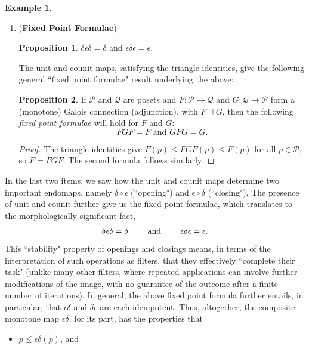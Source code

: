 \documentclass[a4paper]{book}
\theoremstyle{definition}
\newtheorem{example}{Example}[section]
\theoremstyle{definition}
\theoremstyle{definition}
\newtheorem{proposition}{Proposition}[section]
\theoremstyle{theorem}
\theoremstyle{definition}
\begin{document}
\begin{example}
\begin{enumerate}
\item (\textbf{Fixed Point Formulae}) 
\begin{proposition} 
	$\delta \epsilon \delta = \delta$ and $\epsilon \delta \epsilon = \epsilon$.
\end{proposition} 
The unit and counit maps, satisfying the triangle identities, give the following general ``fixed point formulae" result underlying the above: 
\begin{proposition}
	If $\mathcal{P}$ and $\mathcal{Q}$ are posets and $F: \mathcal{P} \rightarrow \mathcal{Q}$ and $G: \mathcal{Q} \rightarrow \mathcal{P}$ form a (monotone) Galois connection (adjunction), with $F \dashv G$, then the following \textit{fixed point formulae} will hold for $F$ and $G$: 
	\begin{equation*}
	FGF = F \text{ and } GFG = G.
	\end{equation*}
\end{proposition} 
\begin{proof}
	The triangle identities give $F(p) \leq FGF(p) \leq F(p)$ for all $p \in \mathcal{P}$, so $F = FGF$. The second formula follows similarly. 
\end{proof}
\end{enumerate} 
In the last two items, we saw how the unit and counit maps determine two important endomaps, namely $\delta \circ \epsilon$ (``opening") and $\epsilon \circ \delta$ (``closing"). The presence of unit and counit further give us the fixed point formulae, which translates to the morphologically-significant fact, 
\begin{equation}
\delta \epsilon \delta = \delta \hspace*{2em} \text{ and } \hspace*{2em} \epsilon \delta \epsilon = \epsilon. 
\end{equation} 
This ``stability" property of openings and closings means, in terms of the interpretation of such operations as filters, that they effectively ``complete their task" (unlike many other filters, where repeated applications can involve further modifications of the image, with no guarantee of the outcome after a finite number of iterations). In general, the above fixed point formula further entails, in particular, that $\epsilon \delta$ and $\delta \epsilon$ are each idempotent. Thus, altogether, the composite monotone map $\epsilon \delta$, for its part, has the properties that 
\begin{itemize}
	\item $p \leq \epsilon \delta (p)$, and 

\end{itemize}
\end{example}
\end{document}
